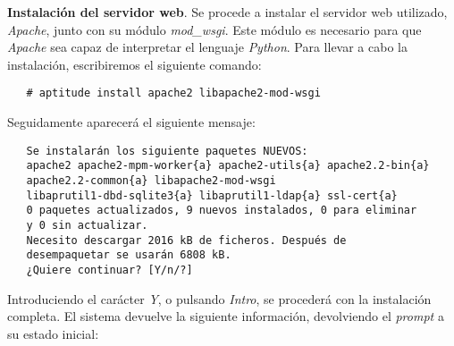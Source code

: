 \item \textbf{Instalación del servidor web}.
   Se procede a instalar el servidor web utilizado, \textit{Apache}, junto
   con su módulo \textit{mod\_wsgi}. Este módulo es necesario para que
   \textit{Apache} sea capaz de interpretar el lenguaje \textit{Python}. Para
   llevar a cabo la instalación, escribiremos el siguiente
   comando:

   \begin{verbatim}
   # aptitude install apache2 libapache2-mod-wsgi
   \end{verbatim}

   Seguidamente aparecerá el siguiente mensaje:

   \begin{verbatim}
   Se instalarán los siguiente paquetes NUEVOS:
   apache2 apache2-mpm-worker{a} apache2-utils{a} apache2.2-bin{a}
   apache2.2-common{a} libapache2-mod-wsgi
   libaprutil1-dbd-sqlite3{a} libaprutil1-ldap{a} ssl-cert{a}
   0 paquetes actualizados, 9 nuevos instalados, 0 para eliminar
   y 0 sin actualizar.
   Necesito descargar 2016 kB de ficheros. Después de
   desempaquetar se usarán 6808 kB.
   ¿Quiere continuar? [Y/n/?]
   \end{verbatim}

   Introduciendo el carácter \textit{Y}, o pulsando \textit{Intro}, se procederá
   con la instalación completa. El sistema devuelve la siguiente información,
   devolviendo el \textit{prompt} a su estado inicial:

